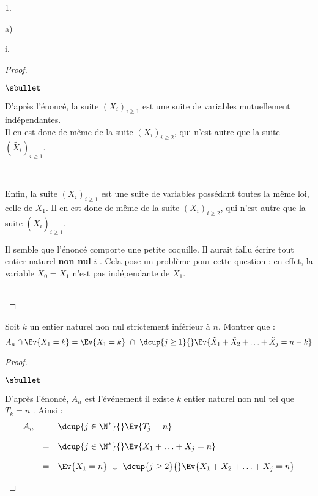 \begin{noliste}{1.}
\begin{noliste}{a)}
\begin{nonoliste}{i.}
      \begin{proof}~%
        \begin{noliste}{$\sbullet$}
        \item D'après l'énoncé, la suite $(X_i)_{i \geq 1}$ est une
          suite de variables mutuellement indépendantes.\\
          Il en est donc de même de la suite $(X_{i})_{i \geq 2}$, qui
          n'est autre que la suite $(\tilde{X_{i}})_{i \geq 1}$.%

        \item ~\\[-.8cm]

        \item Enfin, la suite $(X_i)_{i \geq 1}$ est une suite de
          variables possédant toutes la même loi, celle de $X_1$. Il
          en est donc de même de la suite $(X_{i})_{i \geq 2}$, qui
          n'est autre que la suite $(\tilde{X_{i}})_{i \geq 1}$.%
        \end{noliste}%
        \begin{remark}%
          Il semble que l'énoncé comporte une petite coquille. Il
          aurait fallu écrire \og tout entier naturel {\bf non nul}
          $i$ \fg{}. Cela pose un problème pour cette question : en
          effet, la variable $\tilde{X_0} = X_1$ n'est pas
          indépendante de $X_1$.
        \end{remark}~\\[-1.2cm]
      \end{proof}

    \item Soit $k$ un entier naturel non nul strictement inférieur à
      $n$. Montrer que :
      \[
      A_n \cap \Ev{X_1=k}=\Ev{X_1=k} \ \cap \ \dcup{j \geq 1}{}
      \Ev{\tilde{X}_1+\tilde{X}_2+ \ldots +\tilde{X}_j=n-k}
      \]

      \begin{proof}~%
        \begin{noliste}{$\sbullet$}
        \item D'après l'énoncé, $A_n$ est l'événement \og il existe
          $k$ entier naturel non nul tel que $T_k = n$ \fg{}. Ainsi :
          \[
          \begin{array}{rcl}
            A_n & = & \dcup{j \in \N^*}{} \Ev{T_j = n}
            \\[.4cm]
            & = & \dcup{j \in \N^*}{} \Ev{X_1 + \ldots + X_j = n}
            \\[.4cm]
            & = & \Ev{X_1 = n} \ \cup \ \dcup{j \geq 2}{} \Ev{X_1 +
              X_2 + \ldots + X_j = n} 
          \end{array}
          \]


\end{noliste}
\end{proof}
\end{nonoliste}
\end{noliste}
\end{noliste}

